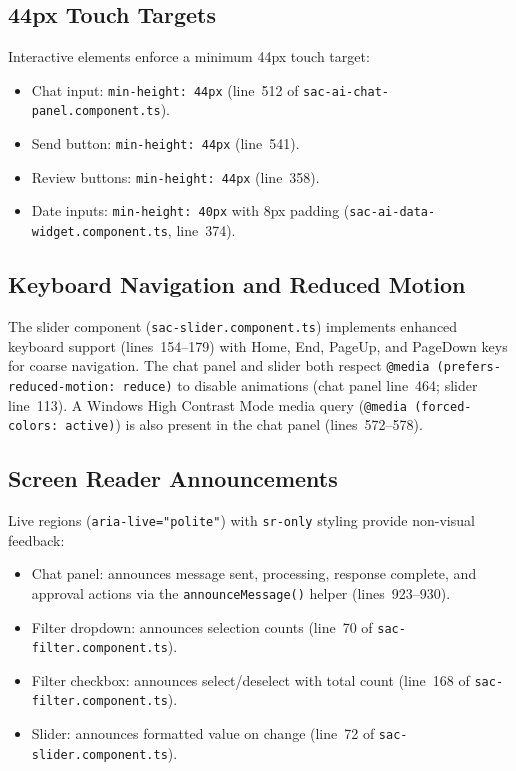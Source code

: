 \documentclass[11pt]{article}
\begin{document}
\subsection{44px Touch Targets}

Interactive elements enforce a minimum 44px touch target:

\begin{itemize}
  \item Chat input: \texttt{min-height: 44px} (line~512 of
    \texttt{sac-ai-chat-panel.component.ts}).
  \item Send button: \texttt{min-height: 44px} (line~541).
  \item Review buttons: \texttt{min-height: 44px} (line~358).
  \item Date inputs: \texttt{min-height: 40px} with 8px padding
    (\texttt{sac-ai-data-widget.component.ts}, line~374).
\end{itemize}

\subsection{Keyboard Navigation and Reduced Motion}

The slider component (\texttt{sac-slider.component.ts}) implements enhanced
keyboard support (lines~154--179) with Home, End, PageUp, and PageDown keys
for coarse navigation. The chat panel and slider both respect
\texttt{@media (prefers-reduced-motion: reduce)} to disable animations
(chat panel line~464; slider line~113). A Windows High Contrast Mode media
query (\texttt{@media (forced-colors: active)}) is also present in the chat
panel (lines~572--578).

\subsection{Screen Reader Announcements}

Live regions (\texttt{aria-live="polite"}) with \texttt{sr-only} styling
provide non-visual feedback:

\begin{itemize}
  \item Chat panel: announces message sent, processing, response complete,
    and approval actions via the \texttt{announceMessage()} helper
    (lines~923--930).
  \item Filter dropdown: announces selection counts (line~70 of
    \texttt{sac-filter.component.ts}).
  \item Filter checkbox: announces select/deselect with total count
    (line~168 of \texttt{sac-filter.component.ts}).
  \item Slider: announces formatted value on change (line~72 of
    \texttt{sac-slider.component.ts}).
\end{itemize}
\end{document}
